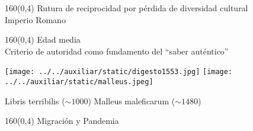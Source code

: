 \documentclass[shownotes,aspectratio=169]{beamer}
\begin{document}
\begin{frame}[plain]
\begin{textblock}{160}(0,4)
\centering \LARGE  \textcolor{black!85}{Rutura de reciprocidad por pérdida de diversidad cultural} \\
\Large Imperio Romano

\end{textblock}


\end{frame}


\begin{frame}[plain]
\begin{textblock}{160}(0,4)
\centering \LARGE  \textcolor{black!85}{Edad media} \\ 
\Large Criterio de autoridad como fundamento del ``saber auténtico''
\end{textblock}
\vspace{2cm}

\centering

\texttt{[image: ../../auxiliar/static/digesto1553.jpg]}
\hspace{0.8cm}
\texttt{[image: ../../auxiliar/static/malleus.jpeg]}

\hspace{0.2cm} Libris terribilis ($\sim 1000$) \hspace{0.2cm} Malleus maleficarum ($\sim 1480$)

\end{frame}


\begin{frame}[plain]
\begin{textblock}{160}(0,4)
\centering \LARGE  \textcolor{black!85}{Migración y Pandemia} \\ 
\end{textblock}
\vspace{2cm}

\centering


\end{frame}
\end{document}
